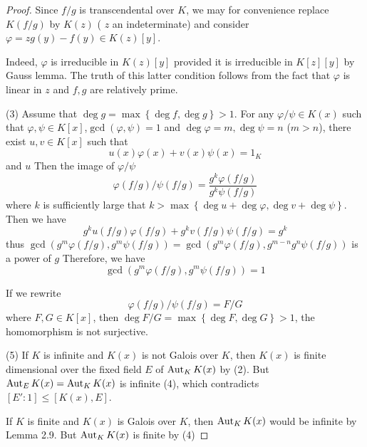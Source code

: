 \begin{proposition}
\begin{proof}
        Since $f / g$ is transcendental over $K$, we may for convenience replace $K(f / g)$ by $K(z)$ ( $z$ an indeterminate) and consider $\varphi=z g(y)-f(y) \in K(z)[y]$.

        Indeed, $\varphi$ is irreducible in $K(z)[y]$ provided it is irreducible in $K[z][y]$ by Gauss lemma.
        The truth of this latter condition follows from the fact that $\varphi$ is linear in $z$ and $f, g$ are relatively prime.

        (3)
        Assume that $\deg g =\max \left\{\deg f, \deg g\right\} >1$. For any $\varphi/\psi \in K\left(x\right)$ such that $\varphi, \psi \in K\left[x\right]$,$\gcd\left(\varphi,\psi\right)=1$ and $\deg \varphi =m, \deg \psi =n$ ($m>n$), there exist $u,v\in K[x]$ such that
        \begin{equation*}
            u(x)\varphi(x)+v(x)\psi(x)
            =
            1_K
        \end{equation*}
        and $u$
        Then the image of $\varphi/\psi$
        \begin{equation*}
            \varphi(f / g) / \psi(f / g)
            =
            \frac{g^k\varphi(f / g)}{g^k\psi(f / g)}
        \end{equation*}
        where $k$ is sufficiently large that $k>\max\left\{\deg u + \deg \varphi,\deg v + \deg \psi\right\} $.
        Then we have
        \begin{equation*}
            g^ku(f/g)\varphi(f/g)+g^kv(f/g)\psi(f/g)
            =
            g^k
        \end{equation*}
        thus $\gcd\left(g^m\varphi(f / g),g^m\psi(f / g)\right)
            =
            \gcd\left(g^m\varphi(f / g),g^{m-n} g^n\psi(f / g)\right)$ is a power of $g$
        Therefore, we have
        \begin{equation*}
            \gcd\left(g^m\varphi(f / g),g^m\psi(f / g)\right) =1
        \end{equation*}

        If we rewrite
        \begin{equation*}
            \varphi(f / g) / \psi(f / g)
            =
            F/G
        \end{equation*}
        where $F,G\in K\left[x\right]$, then $\deg F/G = \max\left\{\deg F,\deg G\right\}>1$, the homomorphism is not surjective.

        (5)
        If $K$ is infinite and $K(x)$ is not Galois over $K$, then $K(x)$ is finite dimensional over the fixed field $E$ of $\operatorname{\operatorname{Aut}}_K K(x)$ by (2).
        But $\operatorname{\operatorname{Aut}}_E K(x)=\operatorname{\operatorname{Aut}}_K K(x)$ is infinite (4), which contradicts $\left[E':1\right]\leq \left[K\left(x\right),E\right]$.

        If $K$ is finite and $K(x)$ is Galois over $K$, then $\operatorname{\operatorname{Aut}}_K K(x)$ would be infinite by Lemma 2.9. But $\operatorname{\operatorname{Aut}}_K K(x)$ is finite by (4)
    \end{proof}
\end{proposition}
